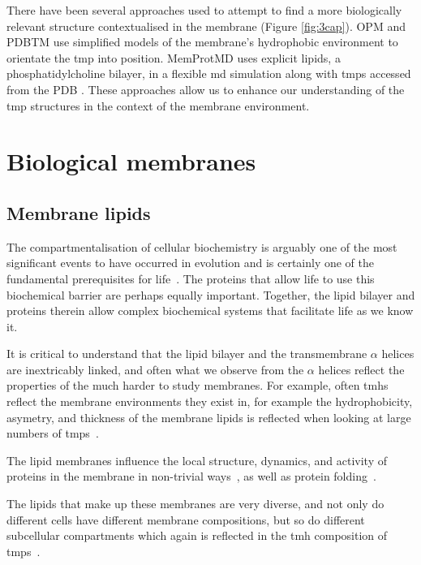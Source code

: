 There have been several approaches used to attempt to find a more biologically relevant structure contextualised in the membrane (Figure \ref{fig:3cap}).
OPM \cite{Lomize2012} and PDBTM \cite{Kozma2012} use simplified models of the membrane's hydrophobic environment to orientate the \gls{tmp} into position.
MemProtMD \cite{Stansfeld2015} uses explicit lipids, a phosphatidylcholine bilayer, in a flexible \gls{md} simulation  along with \gls{tmp}s accessed from the PDB \cite{Berman2000}.
These approaches allow us to enhance our understanding of the \gls{tmp} structures in the context of the membrane environment.



\section{Biological membranes}
\subsection{Membrane lipids}
The compartmentalisation of cellular biochemistry is arguably one of the most significant events to have occurred in evolution and is certainly one of the fundamental prerequisites for life~\cite{Koshland2002}.
The proteins that allow life to use this biochemical barrier are perhaps equally important.
Together, the lipid bilayer and proteins therein allow complex biochemical systems that facilitate life as we know it.

It is critical to understand that the lipid bilayer and the transmembrane $\alpha$ helices are inextricably linked, and often what we observe from the $\alpha$ helices reflect the properties of the much harder to study membranes.
For example, often \gls{tmh}s reflect the membrane environments they exist in, for example the hydrophobicity, asymetry, and thickness of the membrane lipids is reflected when looking at large numbers of \gls{tmp}s~\cite{Sharpe2010}.

The lipid membranes influence the local structure, dynamics, and activity of proteins in the membrane in non-trivial ways~\cite{Bondar2010, Bondar2009, Jardon-Valadez2010, Kalvodova2005, Urban2005, White2001a, Jensen2004, Henin2014}, as well as protein folding~\cite{Kauko2010}.


The lipids that make up these membranes are very diverse, and not only do different cells have different membrane compositions, but so do different subcellular compartments which again is reflected in the \gls{tmh} composition of \gls{tmp}s~\cite{Sharpe2010, VanMeer2008}.

